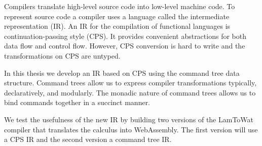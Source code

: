 
Compilers translate high-level source code into low-level machine code. To represent source code a compiler uses a language called the intermediate representation (IR). An IR for the compilation of functional languages is continuation-passing style (CPS). It provides convenient abstractions for both data flow and control flow. However, CPS conversion is hard to write and the transformations on CPS are untyped.

In this thesis we develop an IR based on CPS using the command tree data structure. Command trees allow us to express compiler transformations typically, declaratively, and modularly. The monadic nature of command trees allows us to bind commands together in a succinct manner.

We test the usefulness of the new IR by building two versions of the LamToWat compiler that translates the  calculus into WebAssembly. The first version will use a CPS IR and the second version a command tree IR.